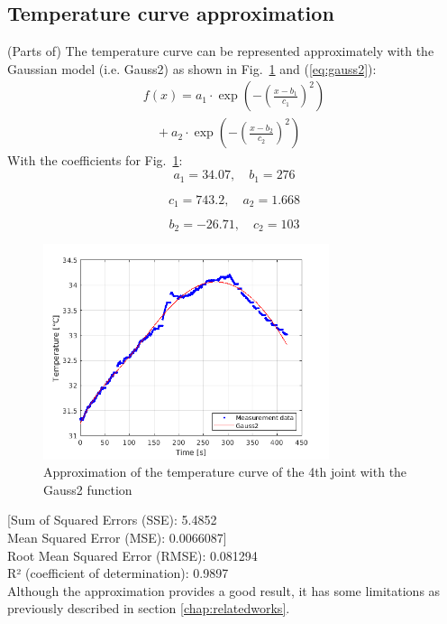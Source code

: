 \documentclass{ifacconf}
\begin{document}
\subsection{Temperature curve approximation}
(Parts of) The temperature curve can be represented approximately with the Gaussian model (i.e. Gauss2) as shown in Fig.~\ref{fig:Gauss2_legend} and (\ref{eq:gauss2}):
\begin{equation} \label{eq:gauss2}
  \begin{array}{l}
  f(x) = a_1 \cdot \exp\left( -\left( \frac{x - b_1}{c_1} \right)^2 \right) \\
  \quad + a_2 \cdot \exp\left( -\left( \frac{x - b_2}{c_2} \right)^2 \right)
  \end{array}
  \end{equation}
With the coefficients for Fig.~\ref{fig:Gauss2_legend}:
\[
a_1 = 34.07, \quad b_1 = 276 
\]

\[
c_1 = 743.2, \quad a_2 = 1.668 
\]

\[
b_2 = -26.71, \quad c_2 = 103
\]

\begin{figure}[t]
  \begin{center}
  \includegraphics[width=8.4cm]{pictures/Gauss2_legend.png}    %
  \caption{Approximation of the temperature curve of the 4th joint with the Gauss2 function} 
  \label{fig:Gauss2_legend}
  \end{center}
\end{figure}
[Sum of Squared Errors (SSE): 5.4852\\
Mean Squared Error (MSE): 0.0066087]\\
Root Mean Squared Error (RMSE): 0.081294\\
R² (coefficient of determination): 0.9897\\
Although the approximation provides a good result, it has some limitations as previously described in section \ref{chap:relatedworks}.
\end{document}
